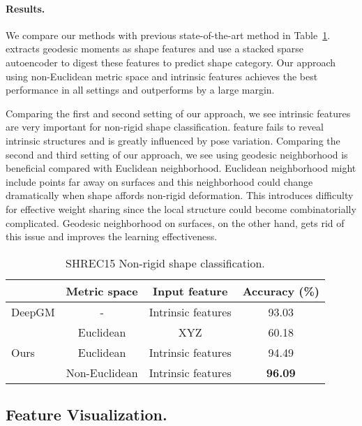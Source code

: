 \documentclass{article}
\begin{document}
\vspace{-0.3cm}
\paragraph{Results.}  
We compare our methods with previous state-of-the-art method \cite{luciano2017deep} in Table~\ref{tab:nonrigid_classification}. \cite{luciano2017deep} extracts geodesic moments as shape features and use a stacked sparse autoencoder to digest these features to predict shape category.
Our approach using non-Euclidean metric space and intrinsic features achieves the best performance in all settings and outperforms \cite{luciano2017deep} by a large margin.

Comparing the first and second setting of our approach, we see intrinsic features are very important for non-rigid shape classification.  feature fails to reveal intrinsic structures and is greatly influenced by pose variation.
Comparing the second and third setting of our approach, we see using geodesic neighborhood is beneficial compared with Euclidean neighborhood. Euclidean neighborhood might include points far away on surfaces and this neighborhood could change dramatically when shape affords non-rigid deformation. This introduces difficulty for effective weight sharing since the local structure could become combinatorially complicated. Geodesic neighborhood on surfaces, on the other hand, gets rid of this issue and improves the learning effectiveness.


\begin{table}[h!]
\centering
\small
\begin{tabular}{lccc}
\toprule
& Metric space & Input feature & Accuracy (\%) \\ \midrule
DeepGM \cite{luciano2017deep} & - & Intrinsic features & 93.03 \\ \midrule
\multirow{3}{*}{Ours} & Euclidean & XYZ & 60.18\\
& Euclidean & Intrinsic features & 94.49\\
& Non-Euclidean & Intrinsic features & \textbf{96.09}\\\bottomrule
\end{tabular}
\caption{SHREC15 Non-rigid shape classification.}
\label{tab:nonrigid_classification}
\vspace{-0.7cm}
\end{table}

\subsection{Feature Visualization.}
\end{document}
